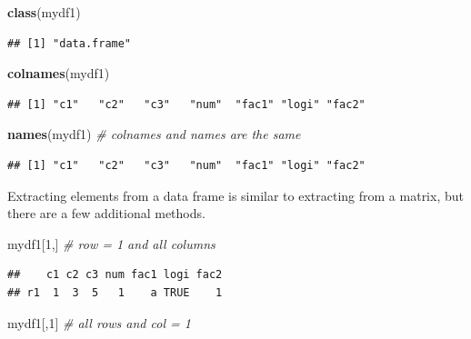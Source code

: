 \documentclass[]{book}
\newenvironment{Shaded}{\begin{snugshade}}{\end{snugshade}}
\newcommand{\KeywordTok}[1]{\textcolor[rgb]{0.13,0.29,0.53}{\textbf{{#1}}}}
\newcommand{\DecValTok}[1]{\textcolor[rgb]{0.00,0.00,0.81}{{#1}}}
\newcommand{\CommentTok}[1]{\textcolor[rgb]{0.56,0.35,0.01}{\textit{{#1}}}}
\newcommand{\NormalTok}[1]{{#1}}
\theoremstyle{definition}
\theoremstyle{definition}
\theoremstyle{remark}
\begin{document}
\begin{Shaded}
\begin{Highlighting}[]
\KeywordTok{class}\NormalTok{(mydf1)}
\end{Highlighting}
\end{Shaded}

\begin{verbatim}
## [1] "data.frame"
\end{verbatim}

\begin{Shaded}
\begin{Highlighting}[]
\KeywordTok{colnames}\NormalTok{(mydf1)}
\end{Highlighting}
\end{Shaded}

\begin{verbatim}
## [1] "c1"   "c2"   "c3"   "num"  "fac1" "logi" "fac2"
\end{verbatim}

\begin{Shaded}
\begin{Highlighting}[]
\KeywordTok{names}\NormalTok{(mydf1)   }\CommentTok{# colnames and names are the same }
\end{Highlighting}
\end{Shaded}

\begin{verbatim}
## [1] "c1"   "c2"   "c3"   "num"  "fac1" "logi" "fac2"
\end{verbatim}

Extracting elements from a data frame is similar to extracting from a
matrix, but there are a few additional methods.

\begin{Shaded}
\begin{Highlighting}[]
\NormalTok{mydf1[}\DecValTok{1}\NormalTok{,]   }\CommentTok{# row = 1 and all columns }
\end{Highlighting}
\end{Shaded}

\begin{verbatim}
##    c1 c2 c3 num fac1 logi fac2
## r1  1  3  5   1    a TRUE    1
\end{verbatim}

\begin{Shaded}
\begin{Highlighting}[]
\NormalTok{mydf1[,}\DecValTok{1}\NormalTok{]   }\CommentTok{# all rows and col = 1}
\end{Highlighting}
\end{Shaded}
\end{document}
